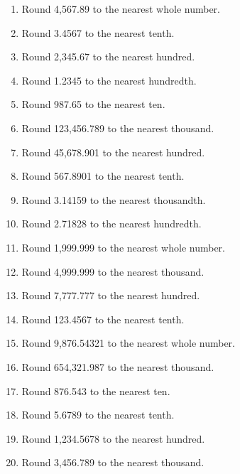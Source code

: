 \documentclass[12pt]{article}
\begin{document}
\begin{enumerate}
    \item Round 4,567.89 to the nearest whole number.
    \item Round 3.4567 to the nearest tenth.
    \item Round 2,345.67 to the nearest hundred.
    \item Round 1.2345 to the nearest hundredth.
    \item Round 987.65 to the nearest ten.
    
    \item Round 123,456.789 to the nearest thousand.
    \item Round 45,678.901 to the nearest hundred.
    \item Round 567.8901 to the nearest tenth.
    \item Round 3.14159 to the nearest thousandth.
    \item Round 2.71828 to the nearest hundredth.
    
    \item Round 1,999.999 to the nearest whole number.
    \item Round 4,999.999 to the nearest thousand.
    \item Round 7,777.777 to the nearest hundred.
    \item Round 123.4567 to the nearest tenth.
    \item Round 9,876.54321 to the nearest whole number.
    
    \item Round 654,321.987 to the nearest thousand.
    \item Round 876.543 to the nearest ten.
    \item Round 5.6789 to the nearest tenth.
    \item Round 1,234.5678 to the nearest hundred.
    \item Round 3,456.789 to the nearest thousand.
\end{enumerate}
\end{document}
